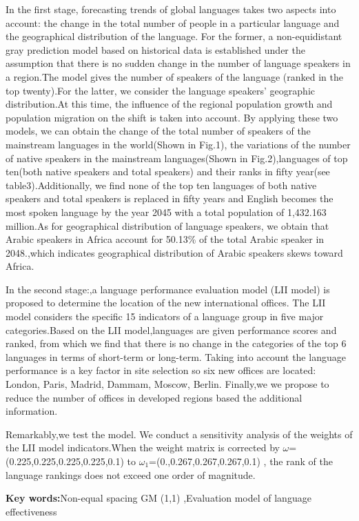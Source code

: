 \noindent In the first stage, forecasting trends of global languages takes two aspects into account: the change in the total number of people in a particular language and the geographical distribution of the language. For the former, a non-equidistant gray prediction model based on historical data is established under the assumption that there is no sudden change in the number of language speakers in a region.The model gives the number of speakers of the language (ranked in the top twenty).For the latter, we consider the language speakers' geographic distribution.At this time, the influence of the regional population growth and population migration on the shift is taken into account. By applying these two models, we can obtain the change of the total number of speakers of the mainstream languages in the world(Shown in Fig.1), the variations of the number of native speakers in the mainstream languages(Shown in Fig.2),languages of top ten(both native speakers and total speakers) and their ranks in fifty year(see table3).Additionally, we find none of the top ten languages of both native speakers and total speakers is replaced in fifty years and English becomes the most spoken language by the year 2045 with a total population of 1,432.163 million.As for geographical distribution of language speakers, we obtain that Arabic speakers in Africa account for 50.13\% of the total Arabic speaker in 2048.,which indicates geographical distribution of Arabic speakers skews toward Africa.
\par In the second stage:,a language performance evaluation model (LII model) is proposed to determine the location of the new international offices. The LII model considers the specific 15 indicators of a language group in five major categories.Based on the LII model,languages are given performance scores and ranked, from which we find that there is no change in the categories of the top 6 languages in terms of short-term or long-term. Taking into account the language performance is a key factor in site selection so six new offices are located: London, Paris,  Madrid, Dammam, Moscow, Berlin. Finally,we we propose to reduce the number of offices in developed regions based the additional information.
\par Remarkably,we test the model. We conduct a sensitivity analysis of the weights of the LII model indicators.When the weight matrix is corrected by $\omega $=\\(0.225,0.225,0.225,0.225,0.1) to ${\omega _1}$=(0.,0.267,0.267,0.267,0.1) , the rank of the language rankings does not exceed one order of magnitude.




\par
\noindent
\textbf{Key words:}Non-equal spacing GM (1,1) ,Evaluation model of language effectiveness 
